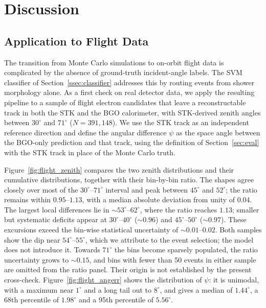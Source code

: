 \documentclass[preprint,12pt]{elsarticle}
\begin{document}
\FloatBarrier
\section{Discussion}
\label{sec:discussion}

\subsection{Application to Flight Data}
\label{ssec:flight}

The transition from Monte Carlo simulations to on-orbit flight data is
complicated by the absence of ground-truth incident-angle labels. The SVM
classifier of Section~\ref{ssec:classifier} addresses this by routing events
from shower morphology alone. As a first check on real detector data, we
apply the resulting pipeline to a sample of flight electron candidates
that leave a reconstructable track in both the STK and the BGO calorimeter,
with STK-derived zenith angles between $30^{\circ}$ and $71^{\circ}$
($N=391{,}148$). We use the STK track as an independent reference direction
and define the angular difference $\psi$ as the space angle between the
BGO-only prediction and that track, using the definition of
Section~\ref{sec:eval} with the STK track in place of the Monte Carlo truth.

Figure~\ref{fig:flight_zenith} compares the two zenith distributions and
their cumulative distributions, together with their bin-by-bin ratio.
The shapes agree closely over most of the $30^{\circ}$--$71^{\circ}$
interval and peak between $45^{\circ}$ and $52^{\circ}$; the ratio remains
within $0.95$--$1.13$, with a median absolute deviation from unity of
$0.04$. The largest local differences lie in $\sim 53^{\circ}$--$62^{\circ}$,
where the ratio reaches $1.13$; smaller but systematic deficits appear at
$30^{\circ}$--$40^{\circ}$ ($\sim 0.96$) and $45^{\circ}$--$50^{\circ}$
($\sim 0.97$). These excursions exceed the bin-wise statistical
uncertainty of $\sim 0.01$--$0.02$. Both samples show the dip near
$54^{\circ}$--$55^{\circ}$, which we attribute to the event selection; the
model does not introduce it. Towards $71^{\circ}$ the bins become sparsely
populated, the ratio uncertainty grows to $\sim 0.15$, and bins with fewer
than 50 events in either sample are omitted from the ratio panel. Their
origin is not established by the present cross-check.
Figure~\ref{fig:flight_angerr} shows the
distribution of $\psi$: it is unimodal, with a maximum near $1^{\circ}$ and
a long tail out to $8^{\circ}$, and gives a median of $1.44^{\circ}$, a
68th percentile of $1.98^{\circ}$ and a 95th percentile of $5.56^{\circ}$.
\end{document}
